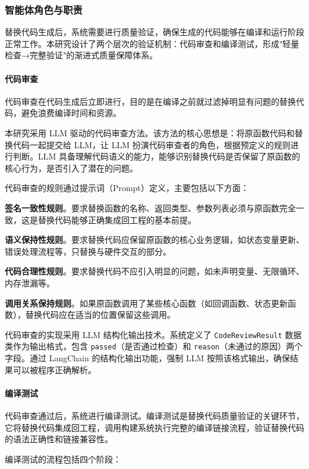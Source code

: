 \subsubsection{智能体角色与职责}

替换代码生成后，系统需要进行质量验证，确保生成的代码能够在编译和运行阶段正常工作。本研究设计了两个层次的验证机制：代码审查和编译测试，形成"轻量检查→完整验证"的渐进式质量保障体系。

\paragraph{代码审查}

代码审查在代码生成后立即进行，目的是在编译之前就过滤掉明显有问题的替换代码，避免浪费编译时间和资源。

本研究采用 LLM 驱动的代码审查方法。该方法的核心思想是：将原函数代码和替换代码一起提交给 LLM，让 LLM 扮演代码审查者的角色，根据预定义的规则进行判断。LLM 具备理解代码语义的能力，能够识别替换代码是否保留了原函数的核心行为，是否引入了潜在的问题。

代码审查的规则通过提示词（Prompt）定义，主要包括以下方面：

\textbf{签名一致性规则}。要求替换函数的名称、返回类型、参数列表必须与原函数完全一致，这是替换代码能够正确集成回工程的基本前提。

\textbf{语义保持性规则}。要求替换代码应保留原函数的核心业务逻辑，如状态变量更新、错误处理流程等，只替换与硬件交互的部分。

\textbf{代码合理性规则}。要求替换代码不应引入明显的问题，如未声明变量、无限循环、内存泄漏等。

\textbf{调用关系保持规则}。如果原函数调用了某些核心函数（如回调函数、状态更新函数），替换代码应在适当的位置保留这些调用。

代码审查的实现采用 LLM 结构化输出技术。系统定义了 \texttt{CodeReviewResult} 数据类作为输出格式，包含 \texttt{passed}（是否通过检查）和 \texttt{reason}（未通过的原因）两个字段。通过 LangChain 的结构化输出功能，强制 LLM 按照该格式输出，确保结果可以被程序正确解析。

\paragraph{编译测试}

代码审查通过后，系统进行编译测试。编译测试是替换代码质量验证的关键环节，它将替换代码集成回工程，调用构建系统执行完整的编译链接流程，验证替换代码的语法正确性和链接兼容性。

编译测试的流程包括四个阶段：

